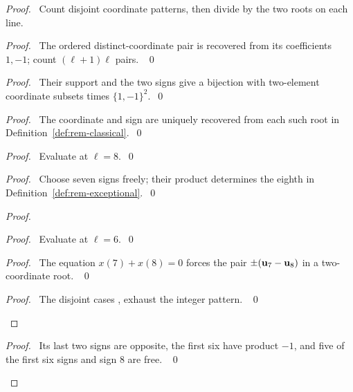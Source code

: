 \begin{proof}
\pfsketch\ Count disjoint coordinate patterns, then divide by the
two roots on each line.
\begin{proof}\pf\ The ordered distinct-coordinate pair is recovered
from its coefficients $1,-1$; count $(\ell+1)\ell$ pairs. ~\qed\end{proof}
\begin{proof}\pf\ Their support and the two signs give a bijection with
two-element coordinate subsets times $\{1,-1\}^2$.~\qed\end{proof}
\begin{proof}\pf\ The coordinate and sign are uniquely recovered from
each such root in Definition~\ref{def:rem-classical}.~\qed\end{proof}
\begin{proof}\pf\ Evaluate  at $\ell=8$.~\qed\end{proof}
\begin{proof}\pf\ Choose seven signs freely; their product determines
the eighth in Definition~\ref{def:rem-exceptional}.~\qed\end{proof}
\begin{proof}
\begin{proof}\pf\ Evaluate  at $\ell=6$.~\qed\end{proof}
\begin{proof}\pf\ The equation $x(7)+x(8)=0$ forces the pair
$\pm({\mathbf u}_7-{\mathbf u}_8)$ in a two-coordinate root. ~\qed\end{proof}
\qedstep
\begin{proof}\pf\ The disjoint cases ,
 exhaust the integer pattern. ~\qed\end{proof}
\end{proof}
\begin{proof}\pf\ Its last two signs are opposite, the first six have
product $-1$, and five of the first six signs and sign 8 are free. ~\qed\end{proof}

\end{proof}
